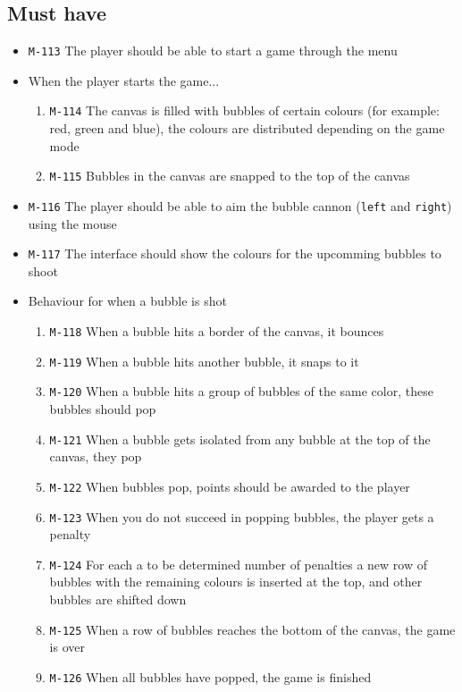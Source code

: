 \documentclass[a4paper]{article}
\begin{document}
\subsection{Must have}

\begin{itemize}
  \item \texttt{M-113} The player should be able to start a game through the menu

  \item When the player starts the game...
  \begin{enumerate}
    \item \texttt{M-114} The canvas is filled with bubbles of certain colours (for example: red, green and blue), the colours are distributed depending on the game mode
    \item \texttt{M-115} Bubbles in the canvas are snapped to the top of the canvas
  \end{enumerate}
  
  \item \texttt{M-116} The player should be able to aim the bubble cannon (\texttt{left} and \texttt{right}) using the mouse
  \item \texttt{M-117} The interface should show the colours for the upcomming bubbles to shoot


  \item Behaviour for when a bubble is shot
  \begin{enumerate}
    \item \texttt{M-118} When a bubble hits a border of the canvas, it bounces
    \item \texttt{M-119} When a bubble hits another bubble, it snaps to it
    \item \texttt{M-120} When a bubble hits a group of bubbles of the same color, these bubbles should pop
    \item \texttt{M-121} When a bubble gets isolated from any bubble at the top of the canvas, they pop
    \item \texttt{M-122} When bubbles pop, points should be awarded to the player
    \item \texttt{M-123} When you do not succeed in popping bubbles, the player gets a penalty
    \item \texttt{M-124} For each a to be determined number of penalties a new row of bubbles with the remaining colours is inserted at the top, and other bubbles are shifted down
    \item \texttt{M-125} When a row of bubbles reaches the bottom of the canvas, the game is over
    \item \texttt{M-126} When all bubbles have popped, the game is finished
  \end{enumerate}
  

\end{itemize}
\end{document}
